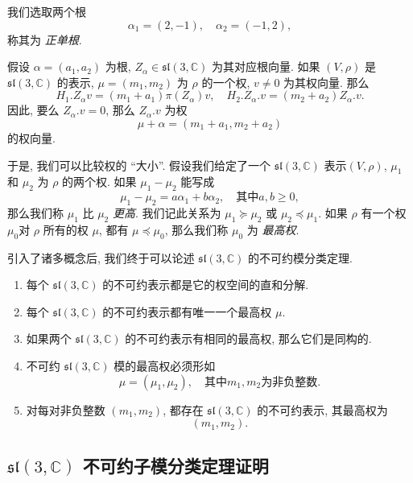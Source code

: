 我们选取两个根
\[
  \alpha_1 = (2, -1),\quad \alpha_2 = (-1, 2),
\]
称其为 \emph{正单根}.

\begin{lemma}
  \label{lemma-sl3C-root-vector-action-on-weight-vector}
  假设 \( \alpha = (a_1, a_2) \) 为根, \( Z_\alpha \in \mathfrak{sl}(3,
  \mathbb{C}) \) 为其对应根向量. 如果 \( (V, \rho) \) 是 \( \mathfrak{sl}(3,
  \mathbb{C}) \) 的表示, \( \mu = (m_1, m_2) \) 为 \( \rho \) 的一个权, \( v
  \neq 0 \) 为其权向量. 那么
  \[
    H_1.Z_\alpha v = (m_1 + a_1) \pi (Z_\alpha)v,\quad H_2.Z_\alpha.v = (m_2 +
    a_2)Z_\alpha.v.
  \]
  因此, 要么 \( Z_\alpha. v = 0 \), 那么 \( Z_\alpha. v \) 为权
  \[
    \mu + \alpha = (m_1 + a_1, m_2 + a_2)
  \]
  的权向量.
\end{lemma}
于是, 我们可以比较权的 ``大小''. 假设我们给定了一个 \( \mathfrak{sl}(3,
\mathbb{C}) \) 表示\( (V, \rho) \), \( \mu_1 \) 和 \( \mu_2 \) 为 \( \rho \)
的两个权. 如果 \( \mu_1 - \mu_2 \) 能写成
\[
  \mu_1 - \mu_2 = a \alpha_1 + b \alpha_2,\quad \text{其中} a, b \geq 0,
\]
那么我们称 \( \mu_1 \) 比 \( \mu_2 \) \emph{更高}. 我们记此关系为 \( \mu_1
\succeq \mu_2 \) 或 \( \mu_2 \preceq \mu_1 \). 如果 \( \rho \) 有一个权 \( \mu_0
\)对 \( \rho \) 所有的权 \( \mu \), 都有 \( \mu \preceq \mu_0 \), 那么我们称 \(
\mu_0 \) 为 \emph{最高权}.

引入了诸多概念后, 我们终于可以论述 \( \mathfrak{sl}(3, \mathbb{C}) \)
的不可约模分类定理.
\begin{theorem}
  \begin{enumerate}
    \item 每个 \( \mathfrak{sl}(3, \mathbb{C}) \)
      的不可约表示都是它的权空间的直和分解.
    \item 每个 \( \mathfrak{sl}(3, \mathbb{C}) \) 的不可约表示都有唯一一个最高权
      \( \mu \).
    \item 如果两个 \( \mathfrak{sl}(3, \mathbb{C}) \)
      的不可约表示有相同的最高权, 那么它们是同构的.
    \item 不可约 \( \mathfrak{sl}(3, \mathbb{C}) \) 模的最高权必须形如
      \[
        \mu = (\mu_1, \mu_2),\quad \text{其中} m_1, m_2 \text{为非负整数}.
      \]
    \item 对每对非负整数 \( (m_1, m_2) \), 都存在 \( \mathfrak{sl}(3,
      \mathbb{C}) \) 的不可约表示, 其最高权为
      \[
        (m_1, m_2).
      \]
  \end{enumerate}
\end{theorem}

\subsection{\texorpdfstring{\( \mathfrak{sl}(3, \mathbb{C}) \)}{sl(3, C)}
不可约子模分类定理证明}

